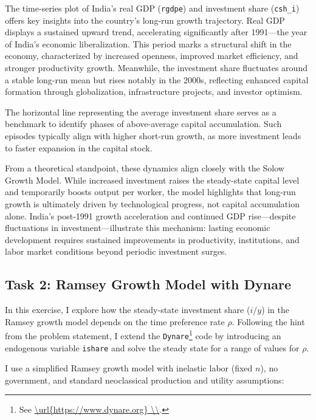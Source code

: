\documentclass[12pt,a4paper,notitlepage]{article}
\numberwithin{equation}{section}
\begin{document}
\begin{itemize}
The time-series plot of India's real GDP (\texttt{rgdpe}) and investment share (\texttt{csh\_i}) offers key insights into the country’s long-run growth trajectory. Real GDP displays a sustained upward trend, accelerating significantly after 1991—the year of India’s economic liberalization. This period marks a structural shift in the economy, characterized by increased openness, improved market efficiency, and stronger productivity growth. Meanwhile, the investment share fluctuates around a stable long-run mean but rises notably in the 2000s, reflecting enhanced capital formation through globalization, infrastructure projects, and investor optimism.

The horizontal line representing the average investment share serves as a benchmark to identify phases of above-average capital accumulation. Such episodes typically align with higher short-run growth, as more investment leads to faster expansion in the capital stock.

From a theoretical standpoint, these dynamics align closely with the Solow Growth Model. While increased investment raises the steady-state capital level and temporarily boosts output per worker, the model highlights that long-run growth is ultimately driven by technological progress, not capital accumulation alone. India's post-1991 growth acceleration and continued GDP rise—despite fluctuations in investment—illustrate this mechanism: lasting economic development requires sustained improvements in productivity, institutions, and labor market conditions beyond periodic investment surges.





\newpage
 \subsection{Task 2: Ramsey Growth Model with Dynare}

In this exercise, I explore how the steady-state investment share ($i/y$) in the Ramsey growth model depends on the time preference rate $\rho$. Following the hint from the problem statement, I extend the \texttt{Dynare}\footnote{See \url {\url{https://www.dynare.org} \\}.} code by introducing an endogenous variable \texttt{ishare} and solve the steady state for a range of values for $\rho$.


I use a simplified Ramsey growth model with inelastic labor (fixed $n$), no government, and standard neoclassical production and utility assumptions:


\end{itemize}
\end{document}
